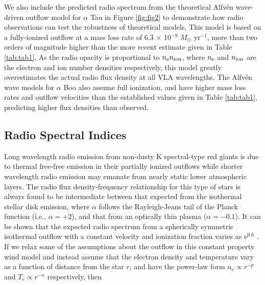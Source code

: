 \documentclass[iop]{emulateapj}
\begin{document}
We also include the predicted radio spectrum from the theoretical Alfv\'{e}n wave-driven outflow model for $\alpha$ Tau \citep{1989AcA....39..51K} in Figure \ref{fig:fig2} to demonstrate how radio observations can test the robustness of theoretical models. This model is based on a fully-ionized outflow at a mass loss rate of  6.3 $\times$ 10$^{-9}$ $M_{\odot}$ yr$^{-1}$, more than two orders of magnitude higher than the more recent estimate given in Table \ref{tab:tab1}. As the radio opacity is proportional to $n _{\rm{e}} n _{\rm{ion}}$, where $n_{\rm{e}}$ and $n_{\rm{ion}}$ are the electron and ion number densities respectively, this model greatly overestimates the actual radio flux density at all VLA wavelengths. The Alfv\'{e}n wave models for $\alpha$ Boo \citep{1988AcA....38..107K} also assume full ionization, and have higher mass loss rates and outflow velocities than the established values given in Table \ref{tab:tab1}, predicting higher flux densities than observed.

\subsection{Radio Spectral Indices} \label{disc:disc3}
Long wavelength radio emission from non-dusty K spectral-type red giants is due to thermal free-free emission in their partially ionized outflows while shorter wavelength radio emission may emanate from nearly static lower atmospheric layers. The radio flux density-frequency relationship for this type of stars is always found to be intermediate between that expected from the isothermal stellar disk emission, where $\alpha$ follows the Rayleigh-Jeans tail of the Planck function (i.e., $\alpha = +2$), and that from an optically thin plasma ($\alpha = -0.1$). It can be shown that the expected radio spectrum from a spherically symmetric isothermal outflow with a constant velocity and ionization fraction varies as $\nu ^{0.6}$ \citep{1975MNRAS.170...41W,1975AA....39..217O,1975AA....39....1P}. If we relax some of the assumptions about the outflow in this constant property wind model and instead assume that the electron density and temperature vary as a function of distance from the star $r$, and have the power-law form $n_{e} \propto r^{-p}$ and $T_{e} \propto r^{-n}$ respectively, then 
\end{document}

